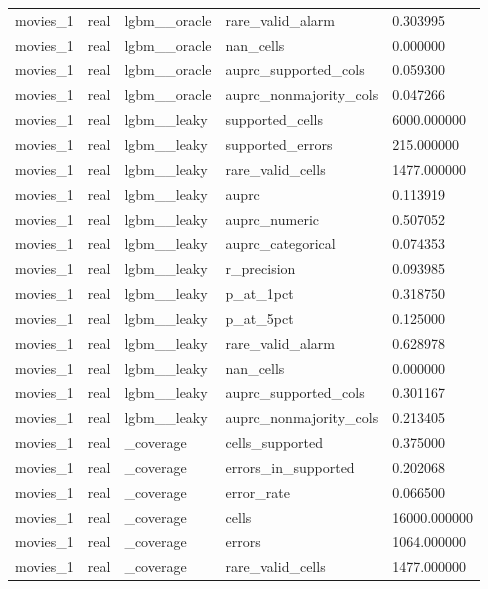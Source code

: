 \begin{tabular}{lllll}
movies\_1 & real & lgbm\_\_oracle & rare\_valid\_alarm & 0.303995 \\
movies\_1 & real & lgbm\_\_oracle & nan\_cells & 0.000000 \\
movies\_1 & real & lgbm\_\_oracle & auprc\_supported\_cols & 0.059300 \\
movies\_1 & real & lgbm\_\_oracle & auprc\_nonmajority\_cols & 0.047266 \\
movies\_1 & real & lgbm\_\_leaky & supported\_cells & 6000.000000 \\
movies\_1 & real & lgbm\_\_leaky & supported\_errors & 215.000000 \\
movies\_1 & real & lgbm\_\_leaky & rare\_valid\_cells & 1477.000000 \\
movies\_1 & real & lgbm\_\_leaky & auprc & 0.113919 \\
movies\_1 & real & lgbm\_\_leaky & auprc\_numeric & 0.507052 \\
movies\_1 & real & lgbm\_\_leaky & auprc\_categorical & 0.074353 \\
movies\_1 & real & lgbm\_\_leaky & r\_precision & 0.093985 \\
movies\_1 & real & lgbm\_\_leaky & p\_at\_1pct & 0.318750 \\
movies\_1 & real & lgbm\_\_leaky & p\_at\_5pct & 0.125000 \\
movies\_1 & real & lgbm\_\_leaky & rare\_valid\_alarm & 0.628978 \\
movies\_1 & real & lgbm\_\_leaky & nan\_cells & 0.000000 \\
movies\_1 & real & lgbm\_\_leaky & auprc\_supported\_cols & 0.301167 \\
movies\_1 & real & lgbm\_\_leaky & auprc\_nonmajority\_cols & 0.213405 \\
movies\_1 & real & \_coverage & cells\_supported & 0.375000 \\
movies\_1 & real & \_coverage & errors\_in\_supported & 0.202068 \\
movies\_1 & real & \_coverage & error\_rate & 0.066500 \\
movies\_1 & real & \_coverage & cells & 16000.000000 \\
movies\_1 & real & \_coverage & errors & 1064.000000 \\
movies\_1 & real & \_coverage & rare\_valid\_cells & 1477.000000 \\
\hline
\end{tabular}
